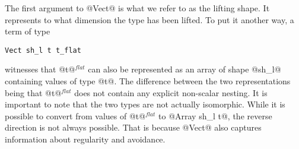 The first argument to @Vect@ is what we refer to as the lifting shape. It represents to what dimension the type has been lifted. To put it another way, a term of type
%
\begin{lstlisting}[style=ndp]
Vect sh_l t t_flat
\end{lstlisting}
%
witnesses that @t@$^{\textit{flat}}$ can also be represented as an array of shape @sh_l@ containing values of type @t@. The difference between the two representations being that @t@$^{\textit{flat}}$ does not contain any explicit non-scalar nesting. It is important to note that the two types are not actually isomorphic. While it is possible to convert from values of @t@$^{\textit{flat}}$ to @Array sh_l  t@, the reverse direction is not always possible. That is because @Vect@ also captures information about regularity and avoidance.

